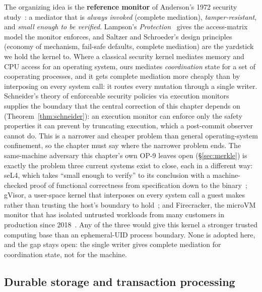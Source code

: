 \documentclass[11pt,a4paper]{article}
\theoremstyle{definition}
\theoremstyle{remark}
\begin{document}
The organizing idea is the \textbf{reference monitor} of Anderson's 1972 security
study~: a mediator that is \emph{always invoked} (complete
mediation), \emph{tamper-resistant}, and \emph{small enough to be verified}.
Lampson's \emph{Protection}~ gives the access-matrix model the
monitor enforces, and Saltzer and Schroeder's design
principles~ (economy of mechanism, fail-safe
defaults, complete mediation) are the yardstick we hold the kernel to. Where a
classical security kernel mediates memory and CPU access for an operating system,
ours mediates \emph{coordination} state for a set of cooperating processes, and it
gets complete mediation more cheaply than by interposing on every system call: it
routes every mutation through a single writer. Schneider's
theory of enforceable security policies via execution monitors~
supplies the boundary that the central correction of this chapter depends on
(Theorem~\ref{thm:schneider}): an execution monitor can enforce only the safety
properties it can prevent by truncating execution, which a post-commit observer
cannot do. This is a narrower and cheaper problem than general operating-system
confinement, so the chapter must say where the narrower problem ends. The
same-machine adversary this chapter's own OP-9 leaves open
(\S\ref{sec:merkle}) is exactly the problem three current systems exist to
close, each in a different way: seL4, which takes ``small enough to verify''
to its conclusion with a machine-checked proof of functional correctness from
specification down to the binary~; gVisor, a user-space
kernel that interposes on every system call a guest makes rather than trusting
the host's boundary to hold~; and Firecracker, the
microVM monitor that has isolated untrusted workloads from many customers in
production since 2018~. Any of the three would
give this kernel a stronger trusted computing base than an ephemeral-UID
process boundary. None is adopted here, and the gap stays open: the single
writer gives complete mediation for coordination state, not for the machine.

\subsection{Durable storage and transaction processing}
\end{document}
